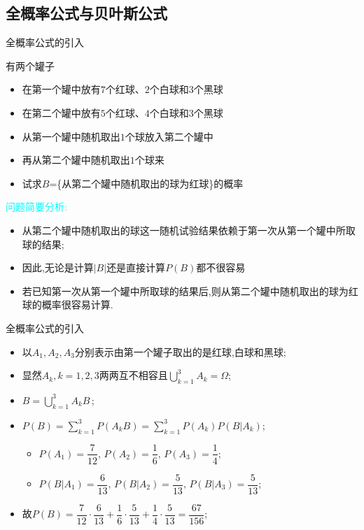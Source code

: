 \documentclass[Prob-All.tex]{subfiles}
\begin{document}
\subsection{全概率公式与贝叶斯公式}
\begin{frame}{全概率公式的引入}

	\begin{exam}
		有两个罐子
			\begin{itemize}[<+-|alert@+>]
			\item 在第一个罐中放有$7$个红球、$2$个白球和$3$个黑球
			\item 在第二个罐中放有$5$个红球、$4$个白球和$3$个黑球
			\item 从第一个罐中随机取出$1$个球放入第二个罐中
			\item 再从第二个罐中随机取出$1$个球来
			\item 试求$B$=\{从第二个罐中随机取出的球为红球\}的概率
		\end{itemize}
	\end{exam}
	\pause
	 \textcolor{cyan}{问题简要分析:}
	\begin{itemize}[<+-|alert@+>]
		\item 从第二个罐中随机取出的球这一随机试验结果依赖于第一次从第一个罐中所取球的结果;
		\item 因此,无论是计算$|B|$还是直接计算$P(B)$都不很容易
		\item 若已知第一次从第一个罐中所取球的结果后,则从第二个罐中随机取出的球为红球的概率很容易计算.
	\end{itemize}
\end{frame}

\begin{frame}{全概率公式的引入}
	\begin{jieda}
	\begin{itemize}[<+-|alert@+>]
		\item 以$A_1,A_2,A_3$分别表示由第一个罐子取出的是红球,白球和黑球;
		\item 显然$A_k, k=1,2,3$两两互不相容且$\bigcup_{k=1}^3A_k=\Omega$;
		\item $B=\bigcup_{k=1}^{3}A_kB\,$;
		\item $ P(B)=\sum_{k=1}^{3} P(A_kB)=\sum_{k=1}^{3} P(A_k) P(B|A_k)$;
		\begin{itemize}
			\item $ P(A_1)=\dfrac{7}{12},\, P(A_2)=\dfrac{1}{6},\, P(A_3)=\dfrac{1}{4}$;
			\item $ P(B|A_1)=\dfrac{6}{13},\, P(B|A_2)=\dfrac{5}{13},\, P(B|A_3)=\dfrac{5}{13}$;
		\end{itemize}
	\item 故$ P(B)=\dfrac{7}{12}·\dfrac{6}{13}+\dfrac{1}{6}·\dfrac{5}{13}+\dfrac{1}{4}·\dfrac{5}{13}=\dfrac{67}{156};$
	\end{itemize}
	\end{jieda}
\end{frame}
\end{document}
